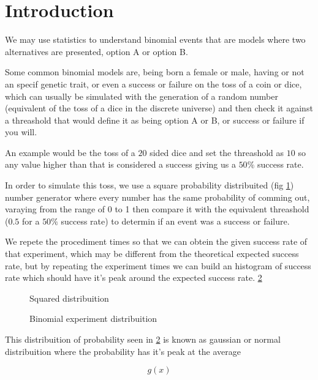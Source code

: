 \section{Introduction}

We may use statistics to understand binomial events that are models where
two alternatives are presented, option A or option B.

Some common binomial models are, being born a female or male, having or not an specif genetic trait,
or even a success or failure on the toss of a coin or dice, which can usually
be simulated with the generation of a random number (equivalent of the toss of a dice in the discrete universe)
and then check it against a threashold that would define it as being
option A or B, or success or failure if you will.

An example would be the toss of a $20$ sided dice and set the threashold as $10$ so any value higher
than that is considered a success giving us a $50\%$ success rate.

In order to simulate this toss, we use a square probability distribuited (fig \ref{intro:squared}) number generator
where every number has the same probability of comming out, varaying from the range of 0 to 1
then compare it with the equivalent threashold ($0.5$ for a $50\%$ success rate) to determin if an event was
a success or failure.

We repete the procediment \introexperimentsize{} times so that we can obtein the given success rate of that experiment,
which may be different from the theoretical expected success rate, but by repeating the experiment
\introexperimentrepeats{} times we can build an histogram of success rate which should have it's peak around the
expected success rate.
\ref{intro:binomial}

\begin{center}
\begin{figure}[H]
\begin{center}
\caption{Squared distribuition}
\label{intro:squared}
\end{center}
\end{figure}
\end{center}

\begin{center}
\begin{figure}[H]
\begin{center}
\caption{Binomial experiment distribuition}
\label{intro:binomial}
\end{center}
\end{figure}
\end{center}

This distribuition of probability seen in \ref{intro:binomial} is known as gaussian or normal distribuition
where the probability has it's peak at the average

\begin{center}
\begin{equation}
  g(x)
\label{intro:gaussian}
\end{equation}
\end{center}

